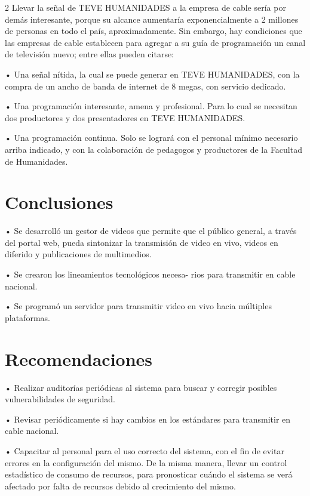 \documentclass[12pt,spanish,Letterpaper,openany]{book}
\begin{document}
\begin {multicols}{2}
Llevar la señal de TEVE HUMANIDADES a la empresa de cable sería por demás interesante, porque su alcance aumentaría exponencialmente a 2 millones de personas en todo el país, aproximadamente. Sin embargo, hay condiciones que las empresas de cable establecen para agregar a su guía de programación un canal de televisión nuevo; entre ellas pueden citarse:

• Una señal nítida, la cual se puede generar en TEVE HUMANIDADES, con la compra de un ancho de banda de internet de 8 megas, con servicio dedicado.

• Una programación interesante, amena y profesional. Para lo cual se necesitan dos productores y dos presentadores en TEVE HUMANIDADES.

• Una programación continua. Solo se logrará con el personal mínimo necesario arriba indicado, y con la colaboración de pedagogos y productores de la Facultad de Humanidades.

\hypertarget{conclusiones-1}{%
\section{Conclusiones}\label{conclusiones-1}}

• Se desarrolló un gestor de videos que permite que el público general, a través del portal web, pueda sintonizar la transmisión de video en vivo, videos en diferido y publicaciones de multimedios.

• Se crearon los lineamientos tecnológicos necesa-
rios para transmitir en cable nacional.

• Se programó un servidor para transmitir video en vivo hacia múltiples plataformas.

\hypertarget{recomendaciones}{%
\section{Recomendaciones}\label{recomendaciones}}

• Realizar auditorías periódicas al sistema para buscar y corregir posibles vulnerabilidades de seguridad.

• Revisar periódicamente si hay cambios en los estándares para transmitir en cable nacional.

• Capacitar al personal para el uso correcto del sistema, con el fin de evitar errores en la configuración del mismo. De la misma manera, llevar un control estadístico de consumo de recursos, para pronosticar cuándo el sistema se verá afectado por falta de recursos debido al crecimiento del mismo.


\end{multicols}
\end{document}
